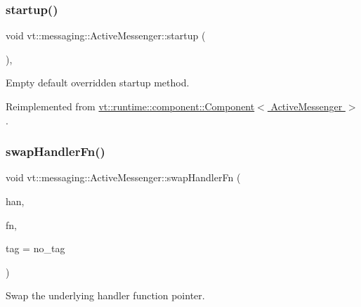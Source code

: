 \subsubsection{\texorpdfstring{startup()}{startup()}}
{\footnotesize\ttfamily void vt\+::messaging\+::\+Active\+Messenger\+::startup (\begin{DoxyParamCaption}{ }\end{DoxyParamCaption})\hspace{0.3cm}{\ttfamily [override]}, {\ttfamily [virtual]}}



Empty default overridden startup method. 



Reimplemented from \hyperlink{structvt_1_1runtime_1_1component_1_1_component_aad3974307ab3b2e1df389a91310f68c2}{vt\+::runtime\+::component\+::\+Component$<$ Active\+Messenger $>$}.

\mbox{\label{structvt_1_1messaging_1_1_active_messenger_aa5544a4d13407ec3432e2eb48a60005d}} 
\subsubsection{\texorpdfstring{swap\+Handler\+Fn()}{swapHandlerFn()}}
{\footnotesize\ttfamily void vt\+::messaging\+::\+Active\+Messenger\+::swap\+Handler\+Fn (\begin{DoxyParamCaption}\item[{\hyperlink{namespacevt_af64846b57dfcaf104da3ef6967917573}{Handler\+Type} const}]{han,  }\item[{\hyperlink{namespacevt_a2a06c34cafcd511828f16cbf1476b924}{Active\+Closure\+Fn\+Type}}]{fn,  }\item[{\hyperlink{namespacevt_a84ab281dae04a52a4b243d6bf62d0e52}{Tag\+Type} const \&}]{tag = {\ttfamily no\+\_\+tag} }\end{DoxyParamCaption})}



Swap the underlying handler function pointer. 


